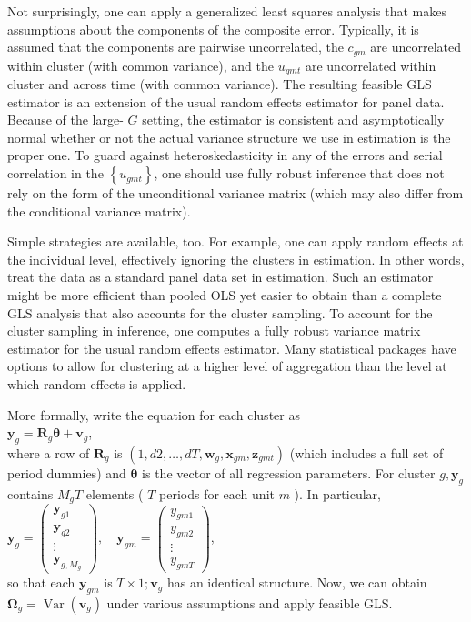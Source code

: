 \documentclass[10pt]{article}
\begin{document}
Not surprisingly, one can apply a generalized least squares analysis that makes assumptions about the components of the composite error. Typically, it is assumed that the components are pairwise uncorrelated, the $c_{g m}$ are uncorrelated within cluster (with common variance), and the $u_{g m t}$ are uncorrelated within cluster and across time (with common variance). The resulting feasible GLS estimator is an extension of the usual random effects estimator for panel data. Because of the large- $G$ setting, the estimator is consistent and asymptotically normal whether or not the actual variance structure we use in estimation is the proper one. To guard against heteroskedasticity in any of the errors and serial correlation in the $\left\{u_{g m t}\right\}$, one should use fully robust inference that does not rely on the form of the unconditional variance matrix (which may also differ from the conditional variance matrix).

Simple strategies are available, too. For example, one can apply random effects at the individual level, effectively ignoring the clusters in estimation. In other words, treat the data as a standard panel data set in estimation. Such an estimator might be more efficient than pooled OLS yet easier to obtain than a complete GLS analysis that also accounts for the cluster sampling. To account for the cluster sampling in inference, one computes a fully robust variance matrix estimator for the usual random effects estimator. Many statistical packages have options to allow for clustering at a higher level of aggregation than the level at which random effects is applied.

More formally, write the equation for each cluster as\\
$\mathbf{y}_{g}=\mathbf{R}_{g} \boldsymbol{\theta}+\mathbf{v}_{g}$,\\
where a row of $\mathbf{R}_{g}$ is $\left(1, d 2, \ldots, d T, \mathbf{w}_{g}, \mathbf{x}_{g m}, \mathbf{z}_{g m t}\right)$ (which includes a full set of period dummies) and $\boldsymbol{\theta}$ is the vector of all regression parameters. For cluster $g, \mathbf{y}_{g}$ contains $M_{g} T$ elements ( $T$ periods for each unit $m$ ). In particular,\\
$\mathbf{y}_{g}=\left(\begin{array}{c}\mathbf{y}_{g 1} \\ \mathbf{y}_{g 2} \\ \vdots \\ \mathbf{y}_{g, M_{g}}\end{array}\right), \quad \mathbf{y}_{g m}=\left(\begin{array}{c}y_{g m 1} \\ y_{g m 2} \\ \vdots \\ y_{g m T}\end{array}\right)$,\\
so that each $\mathbf{y}_{g m}$ is $T \times 1 ; \mathbf{v}_{g}$ has an identical structure. Now, we can obtain $\boldsymbol{\Omega}_{g}=\operatorname{Var}\left(\mathbf{v}_{g}\right)$ under various assumptions and apply feasible GLS.
\end{document}
